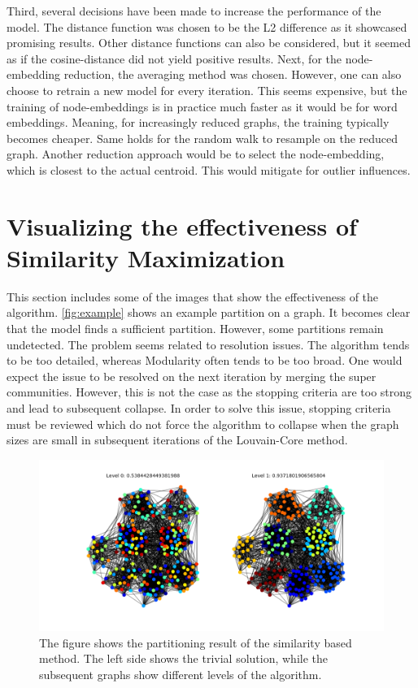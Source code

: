 \documentclass[11pt, twocolumn]{article}
\begin{document}
Third, several decisions have been made to increase the performance of the model. The distance function was chosen to be the L2 difference as it showcased promising results. Other distance functions can also be considered, but it seemed as if the cosine-distance did not yield positive results. Next, for the node-embedding reduction, the averaging method was chosen. However, one can also choose to retrain a new model for every iteration. This seems expensive, but the training of node-embeddings is in practice much faster as it would be for word embeddings. Meaning, for increasingly reduced graphs, the training typically becomes cheaper. Same holds for the random walk to resample on the reduced graph. Another reduction approach would be to select the node-embedding, which is closest to the actual centroid. This would mitigate for outlier influences. 


\section{Visualizing the effectiveness of Similarity Maximization}
This section includes some of the images that show the effectiveness of the algorithm. \autoref{fig:example} shows an example partition on a graph. It becomes clear that the model finds a sufficient partition. However, some partitions remain undetected. The problem seems related to resolution issues. The algorithm tends to be too detailed, whereas Modularity often tends to be too broad. One would expect the issue to be resolved on the next iteration by merging the super communities. However, this is not the case as the stopping criteria are too strong and lead to subsequent collapse. In order to solve this issue, stopping criteria must be reviewed which do not force the algorithm to collapse when the graph sizes are small in subsequent iterations of the Louvain-Core method.

\begin{figure}[h]
  \includegraphics[width=\linewidth]{example.png}
  \caption{The figure shows the partitioning result of the similarity based method. The left side shows the trivial solution, while the subsequent graphs show different levels of the algorithm.}
  \label{fig:example}
\end{figure}
\end{document}
